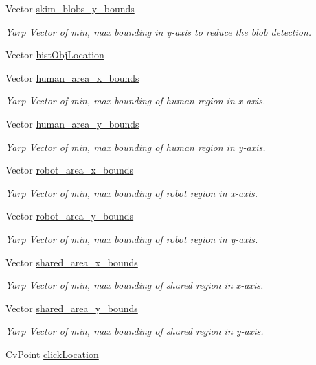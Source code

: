 \begin{DoxyCompactItemize}
Vector \hyperlink{group__iol2opc_ae74b7043710384997ede028e0991fd6f}{skim\+\_\+blobs\+\_\+y\+\_\+bounds}
\begin{DoxyCompactList}\small\item\em Yarp Vector of min, max bounding in y-\/axis to reduce the blob detection. \end{DoxyCompactList}\item 
Vector \hyperlink{group__iol2opc_a6cc8ffebdd654152848639f33d1d4858}{hist\+Obj\+Location}
\item 
Vector \hyperlink{group__iol2opc_a1c9e052961da72723c385bad7757e105}{human\+\_\+area\+\_\+x\+\_\+bounds}
\begin{DoxyCompactList}\small\item\em Yarp Vector of min, max bounding of human region in x-\/axis. \end{DoxyCompactList}\item 
Vector \hyperlink{group__iol2opc_a50a6288c938f47d639b4392472ab01c6}{human\+\_\+area\+\_\+y\+\_\+bounds}
\begin{DoxyCompactList}\small\item\em Yarp Vector of min, max bounding of human region in y-\/axis. \end{DoxyCompactList}\item 
Vector \hyperlink{group__iol2opc_a1a5966db1522c0e5888465eb33d52430}{robot\+\_\+area\+\_\+x\+\_\+bounds}
\begin{DoxyCompactList}\small\item\em Yarp Vector of min, max bounding of robot region in x-\/axis. \end{DoxyCompactList}\item 
Vector \hyperlink{group__iol2opc_aa8bae109b5a9d58a0b191914497046d2}{robot\+\_\+area\+\_\+y\+\_\+bounds}
\begin{DoxyCompactList}\small\item\em Yarp Vector of min, max bounding of robot region in y-\/axis. \end{DoxyCompactList}\item 
Vector \hyperlink{group__iol2opc_a48edc965e39929871bcd4b074d51c866}{shared\+\_\+area\+\_\+x\+\_\+bounds}
\begin{DoxyCompactList}\small\item\em Yarp Vector of min, max bounding of shared region in x-\/axis. \end{DoxyCompactList}\item 
Vector \hyperlink{group__iol2opc_a1cf551318c3b94be6e385bf40146dc09}{shared\+\_\+area\+\_\+y\+\_\+bounds}
\begin{DoxyCompactList}\small\item\em Yarp Vector of min, max bounding of shared region in y-\/axis. \end{DoxyCompactList}\item 
Cv\+Point \hyperlink{group__iol2opc_ab278fa0fa676cb4634501053f7ce6a82}{click\+Location}
\end{DoxyCompactItemize}
